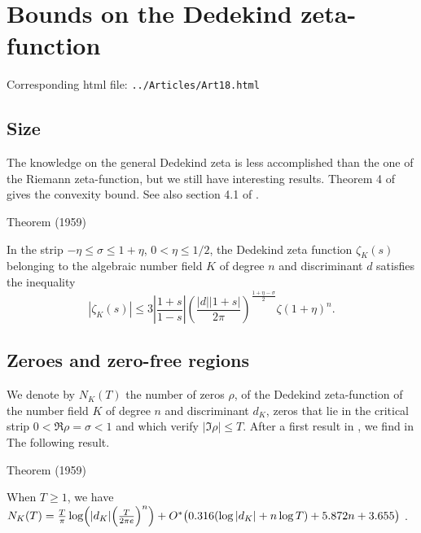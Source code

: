 \chapter{  Bounds on the Dedekind zeta-function}

Corresponding html file: \texttt{../Articles/Art18.html}










 
 


\par 
\section{Size }


The knowledge on the general Dedekind zeta is less accomplished than
the one of the Riemann zeta-function, but we still have interesting
results. Theorem 4 of \cite{Rademacher*59} gives
the convexity bound. See also section 4.1 of
\cite{Trudgian*13}.
\par 
\begin{thm}{Theorem (1959)}

In the strip $-\eta\le \sigma\le 1+\eta$, $0 < \eta\le 1/2$, the Dedekind zeta
function $\zeta_K(s)$ belonging to the algebraic number field $K$ of degree
$n$ and discriminant $d$ satisfies the inequality
$$
|\zeta_K(s)|\le 3 \left|\frac{1+s}{1-s}\right|
\left(\frac{|d||1+s|}{2\pi}\right)^{\frac{1+\eta-\sigma}{2}}
\zeta(1+\eta)^n.
$$
\end{thm}


\par 

\section{Zeroes and zero-free regions }


We denote by $N_K(T)$ the number of zeros $\rho$, of the Dedekind
zeta-function of the number field $K$ of degree $n$ and discriminant
$d_K$,
zeros that lie in the critical strip
$0 < \Re \rho = \sigma < 1$ and which verify $|\Im \rho|\le T$.
After a first result in
\cite{Kadiri-Ng*12},
we find in
\cite{Trudgian*14-1}
The following result.

\par 
\begin{thm}{Theorem (1959)}

 When $T\ge1$, we have
 $N_K(T)=\frac{T}{\pi}\log\Bigl(|d_K|\Big(\frac{T}{2\pi e}\Bigr)^n\Bigr)
 +O^*\bigl(0.316(\log |d_K|+n\log T)+5.872 n+3.655\bigr)$ .
\end{thm}


